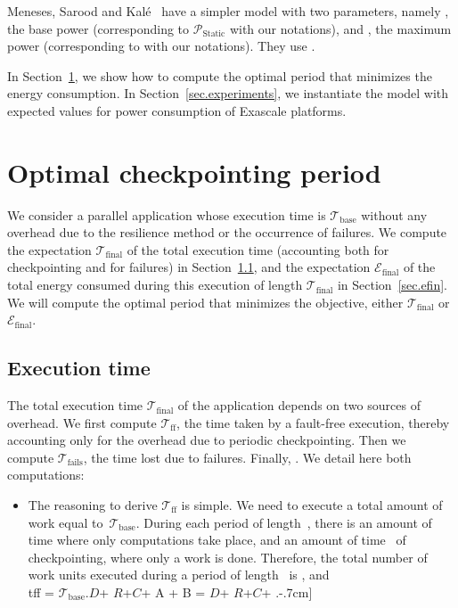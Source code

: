 \documentclass[a4paper]{article}
\newcommand{\ema}[1]{\ensuremath{#1}\xspace}
\newcommand{\ccc}{\ema{C}}
\newcommand{\rrr}{\ema{R}}
\newcommand{\ddd}{\ema{D}}
\newcommand{\period}{T}
\renewcommand{\time}[1][]{\ema{\mathcal{T}_{\text{#1}}}}
\newcommand{\tbase}{\time[base]}
\newcommand{\tff}{\time[ff]}
\newcommand{\tfails}{\time[fails]}
\newcommand{\tfin}{\time[final]}
\newcommand{\power}[1][]{\ema{\mathcal{P}_{\text{#1}}}}
\newcommand{\pIdle}{\power[Static]}
\newcommand{\E}[1][]{\ema{\mathcal{E}_{\text{#1}}}}
\newcommand{\efin}{\E[final]}
\newcommand{\workduringckpt}{\omega}
\begin{document}
Meneses, Sarood and Kalé~\cite{Kale2012} have a simpler model with two parameters, namely , the base power
(corresponding to \pIdle with our notations), and , the maximum power 
(corresponding to  with our notations). They use .

In Section~\ref{sec.period}, we show how to compute the optimal period that minimizes  the energy 
consumption.  In Section~\ref{sec.experiments},  we instantiate the model with expected values for power 
consumption of Exascale platforms.


\section{Optimal checkpointing period}
\label{sec.period}

We consider a parallel application whose execution time is 
\tbase without any overhead due to the resilience method or the occurrence of failures.
We compute the expectation \tfin of the total execution time (accounting both for checkpointing and for failures)
in Section~\ref{sec.tfin}, and the expectation \efin of the total energy consumed during this execution
of length \tfin in Section~\ref{sec.efin}. We will compute the optimal period  that minimizes
the objective, either \tfin or \efin.


\subsection{Execution time}
\label{sec.tfin}

The total execution time \tfin of the application depends on two sources of overhead. We 
first compute \tff, the time taken by a fault-free execution, thereby accounting only 
for the overhead due to 
periodic checkpointing. Then we compute \tfails, the time lost due to failures. Finally,  
. We detail here both computations:
\begin{itemize}
	\item The reasoning to derive \tff is simple. We need to execute a total amount of work equal to~\tbase.
	During each period of length~,
there is an amount of time  where only computations take place, and an amount of time~ 
of checkpointing, where only a work  is done. Therefore, the total number of work
units executed during a period of length~ is ,
and \\tff = \tbase \frac{\period}{\period - (1- \workduringckpt) \ccc}.\ddd + \rrr +\workduringckpt\ccc + \frac{\period - \ccc}{\period} A + \frac{\ccc}{\period} B = \ddd + \rrr +\workduringckpt\ccc + \frac{\period}{2}.-.7cm]
	
\end{itemize}
\end{document}
